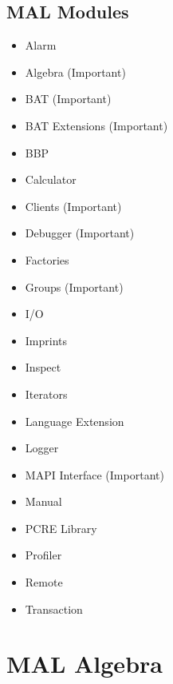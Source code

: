 \documentclass[11pt]{article}
\begin{document}
\subsection{MAL Modules}
\label{sec:org4e6ddc2}
\begin{itemize}
\item Alarm
\item Algebra (Important)
\item BAT (Important)
\item BAT Extensions (Important)
\item BBP
\item Calculator
\item Clients (Important)
\item Debugger (Important)
\item Factories
\item Groups (Important)
\item I/O
\item Imprints
\item Inspect
\item Iterators
\item Language Extension
\item Logger
\item MAPI Interface (Important)
\item Manual
\item PCRE Library
\item Profiler
\item Remote
\item Transaction
\end{itemize}


\section{MAL Algebra}
\label{sec:org29da744}
\end{document}
